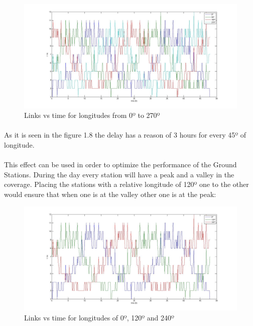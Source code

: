 \documentclass[12pt,a4paper]{report}
\begin{document}
\begin{figure}[H]
\begin{center}
\includegraphics[scale=0.30]{0_90_270_long.jpg}
\caption{Links vs time for longitudes from 0º to 270º}
\end{center}
\end{figure}

\paragraph{}
As it is seen in the figure 1.8 the delay has a reason of 3 hours for every 45º of longitude. 
\paragraph{}
This effect can be used in order to optimize the performance of the Ground Stations. During the day every station will have a peak and a valley in the coverage. Placing the stations with a relative longitude of 120º one to the other would ensure that when one is at the valley other one is at the peak:

\begin{figure}[H]
\begin{center}
\includegraphics[scale=0.30]{0_120_240_long.jpg}
\caption{Links vs time for longitudes of 0º, 120º and 240º}
\end{center}
\end{figure}
\end{document}
